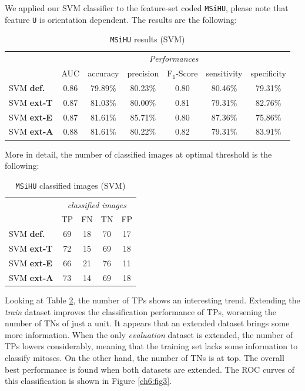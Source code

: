 We applied our \Gls{SVM} classifier to the feature-set coded \texttt{MSiHU}, please note that feature \texttt{U} is orientation dependent. The results are the following:

\begin{table}[!hbt]
\small
 \centering
 \begin{tabular}{lcccccc}
  \toprule
  & \multicolumn{6}{c}{\textit{Performances}} \\
  \cmidrule(lr){2-7}
  & AUC  & accuracy & precision & F$_1$-Score & sensitivity & specificity \\
  \midrule
    SVM \textbf{def.}      & 0.86 & 79.89\% &  80.23\% &   0.80 &  80.46\% & 79.31\%  \\
    SVM \textbf{ext-T}     & 0.87 & 81.03\% &  80.00\% &   0.81 &  79.31\% & 82.76\%  \\
    SVM \textbf{ext-E}     & 0.87 & 81.61\% &  85.71\% &   0.80 &  87.36\% & 75.86\%  \\
    SVM \textbf{ext-A}     & 0.88 & 81.61\% &  80.22\% &   0.82 &  79.31\% & 83.91\% \\
  \bottomrule
    \end{tabular}
 \caption{\texttt{MSiHU} results (SVM)}
 \label{ch6:tab3}
\end{table}

  
More in detail, the number of classified images at optimal threshold is the following:


\begin{table}[!hbt]
\small
 \centering
 \begin{tabular}{lcccc}
  \toprule
  & \multicolumn{4}{c}{\textit{classified images}} \\
  \cmidrule(lr){2-5}
   & TP  & FN & TN & FP  \\
   \midrule
    SVM \textbf{def.}      & 69 & 18 & 70 & 17  \\
    SVM \textbf{ext-T}     & 72 & 15 & 69 & 18  \\
    SVM \textbf{ext-E}     & 66 & 21 & 76 & 11  \\
    SVM \textbf{ext-A}     & 73 & 14 & 69 & 18 \\
   \bottomrule
 \end{tabular}
 \caption{\texttt{MSiHU} classified images (SVM)}
 \label{ch6:tab4}
\end{table}  
  
Looking at Table \ref{ch6:tab4}, the number of \Glspl{TP} shows an interesting trend. Extending the \textit{train} dataset improves the classification performance of \Glspl{TP},
worsening the number of \Glspl{TN} of just a unit. It appears that an extended dataset brings some more information. When the only \textit{evaluation} dataset is extended,
the number of \Glspl{TP} lowers considerably, meaning that the training set lacks some information to classify mitoses. On the other hand, the number of \Glspl{TN} is at top.
The overall best performance is found when both datasets are extended.
The \Gls{ROC} curves of this classification is shown in Figure \ref{ch6:fig3}.

